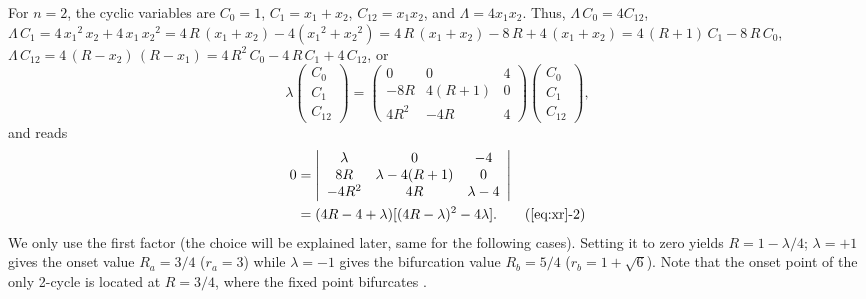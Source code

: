 \documentclass{ws-ijbc}
\begin{document}
For $n = 2$, the cyclic variables are
$C_0 = 1$,
$C_1 = x_1 + x_2$,
$C_{12} = x_1 x_2$,
and $\Lambda = 4 x_1 x_2$.
Thus,
$\Lambda \, C_0 = 4 C_{12}$,
$\Lambda \, C_1 = 4 \, {x_1}^2 \, x_2 + 4 \, x_1 \, {x_2}^2
  = 4 \, R \, (x_1 + x_2) - 4 ({x_1}^2 + {x_2}^2)
  = 4 \, R \, (x_1 + x_2) - 8 \, R + 4 \, (x_1 + x_2)
  = 4 \, (R + 1) \, C_1 - 8 \, R \, C_0$,
$\Lambda \, C_{12}
  = 4 \, (R-x_2)\, (R-x_1)
  = 4\, R^2  \, C_0 - 4 \, R \, C_1 + 4 \, C_{12}$,
or
\[
\lambda
  \left( \begin{array}{c}
  C_0 \\
  C_1 \\
  C_{12}
  \end{array} \right)
 =
  \left( \begin{array}{ccc}
  0           & 0         & 4 \\
  -8R         & 4(R+1)    & 0 \\
  4R^2        & -4R       & 4
  \end{array} \right)
  \left( \begin{array}{c}
  C_0 \\
  C_1 \\
  C_{12}
  \end{array} \right),
\]
%
%
%
and  reads
%
%
%
\begin{align}
0 &=
  \left| \begin{array}{ccc}
  \lambda     & 0               & -4 \\
  8R          & \lambda-4(R+1)  & 0 \\
  -4R^2       & 4R              & \lambda-4
  \end{array} \right| \nonumber\\
  &= (4R - 4 + \lambda) [(4 R-\lambda)^2 - 4 \lambda].
  \tag{\ref{eq:xr}-2}
\label{eq:xr2}
\end{align}
%
%
%
We only use the first factor
(the choice will be explained later, same for the following cases).
%
Setting it to zero yields $R = 1 - \lambda/4$;
$\lambda = +1$ gives the onset value $R_a = 3/4$ ($r_a = 3$)
while
$\lambda = -1$ gives the bifurcation value $R_b = 5/4$ ($r_b = 1+\sqrt 6$).
%
Note that the onset point of the only 2-cycle
  is located at $R = 3/4$,
  where the fixed point bifurcates \cite{strogatz}
  .
\end{document}
